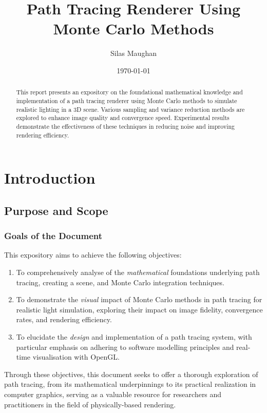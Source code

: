 \documentclass[12pt]{article}
\title{Path Tracing Renderer Using Monte Carlo Methods}
\author{Silas Maughan}
\date{\today}
\begin{document}
\maketitle
\begin{abstract}
    This report presents an expository on the foundational mathematical knowledge and implementation of a path tracing renderer using Monte Carlo methods to simulate realistic lighting in a 3D scene. Various sampling and variance reduction methods are explored to enhance image quality and convergence speed. Experimental results demonstrate the effectiveness of these techniques in reducing noise and improving rendering efficiency.
\end{abstract}

\tableofcontents
\break
\section{Introduction}
\label{sec:intro}
\subsection{Purpose and Scope}
\subsubsection{Goals of the Document}

This expository aims to achieve the following objectives:
\begin{enumerate}
    \item To comprehensively analyse of the \textit{mathematical} foundations underlying path tracing, creating a scene, and Monte Carlo integration techniques.

    \item To demonstrate the \textit{visual} impact of Monte Carlo methods in path tracing for realistic light simulation, exploring their impact on image fidelity, convergence rates, and rendering efficiency.

    \item To elucidate the \textit{design} and implementation of a path tracing system, with particular emphasis on adhering to software modelling principles and real-time visualisation with OpenGL.
\end{enumerate}

Through these objectives, this document seeks to offer a thorough exploration of path tracing, from its mathematical underpinnings to its practical realization in computer graphics, serving as a valuable resource for researchers and practitioners in the field of physically-based rendering.
\end{document}
